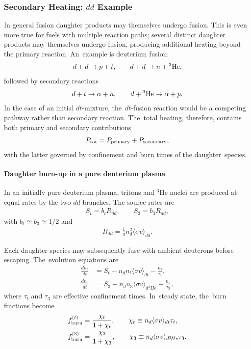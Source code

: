 \documentclass[particles,article,accept,pdftex,moreauthors]{Definitions/mdpi}
\begin{document}
\subsubsection{Secondary Heating: \texorpdfstring{$dd$}{dd} Example}\label{ssubsec:SecondHeating}
In general fusion daughter products may themselves undergo fusion. This is even more true for fuels with multiple reaction paths; several distinct daughter products may themselves undergo fusion, producing additional heating beyond the primary reaction. An~example is deuterium fusion:
\begin{align}
 d + d \to p + t,\qquad
 d + d \to n + {}^3{\rm He},
\end{align}
followed by secondary reactions
\begin{align}
 d + t \to \alpha + n,\qquad
d + {}^3{\rm He} \to \alpha + p .
\end{align}
In the case of an initial $dt$-mixture, the~$dt$-fusion reaction would be a competing pathway rather than secondary reaction. The~total heating, therefore, contains both primary and secondary contributions
\begin{align}
P_{\rm tot}
= P_{\rm primary}
+ P_{\rm secondary},
\end{align}
with the latter governed by confinement and burn times of the daughter~species.

\vspace{-6pt}\paragraph*{\bf Daughter burn-up in a pure deuterium plasma}
In an initially pure deuterium plasma, tritons and ${}^3\mathrm{He}$ nuclei are produced at equal rates by the two $dd$ branches. 
The source rates are
\begin{align}
S_t = b_t R_{dd},\qquad
S_3 = b_3 R_{dd},
\end{align}
with $b_t \simeq b_3 \simeq 1/2$ and
\begin{align}
R_{dd} = \frac12 n_d^2\langle\sigma v\rangle_{dd}.
\end{align}

Each daughter species may subsequently fuse with ambient deuterons before escaping. The~evolution equations are~\cite{harms2000principles,morse2018nuclear}
\begin{align}
\frac{dn_t}{dt}
&= S_t
- n_d n_t \langle\sigma v\rangle_{dt}
- \frac{n_t}{\tau_t}, \\
\frac{dn_3}{dt}
&= S_3
- n_d n_3 \langle\sigma v\rangle_{d{}^3\!He}
- \frac{n_3}{\tau_3},
\end{align}
where $\tau_t$ and $\tau_3$ are effective confinement times. In~steady state, the~burn fractions become
\begin{align}
f_{\rm burn}^{(t)} &= \frac{\chi_t}{1+\chi_t},
\qquad
\chi_t \equiv n_d\langle\sigma v\rangle_{dt}\tau_t, \\
f_{\rm burn}^{(3)} &= \frac{\chi_3}{1+\chi_3},
\qquad
\chi_3 \equiv n_d\langle\sigma v\rangle_{d{}^3\!He}\tau_3.
\end{align}
\end{document}
